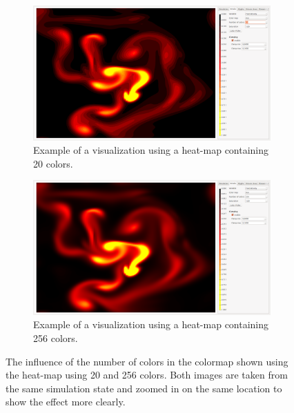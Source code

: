 \begin{figure}[tb]
	\centering
	\begin{subfigure}{0.4\textwidth}
		\centering
		\includegraphics[width=\textwidth, trim={235px 30px 1230px 830px}, clip]{colormapping/img/heat20}
		\caption{Example of a visualization using a heat-map containing 20 colors.}
		\label{fig:colormapping:banding:20}
	\end{subfigure}
	\hspace{50px}
	\begin{subfigure}{0.4\textwidth}
		\centering
		\includegraphics[width=\textwidth, trim={235px 30px 1230px 830px}, clip]{colormapping/img/heat256}
		\caption{Example of a visualization using a heat-map containing 256 colors.}
		\label{fig:colormapping:banding:256}
	\end{subfigure}	
	\caption{The influence of the number of colors in the colormap shown using the heat-map using 20  and 256  colors. Both images are taken from the same simulation state and zoomed in on the same location to show the effect more clearly.}
	\label{fig:colormaps:banding}
\end{figure}

